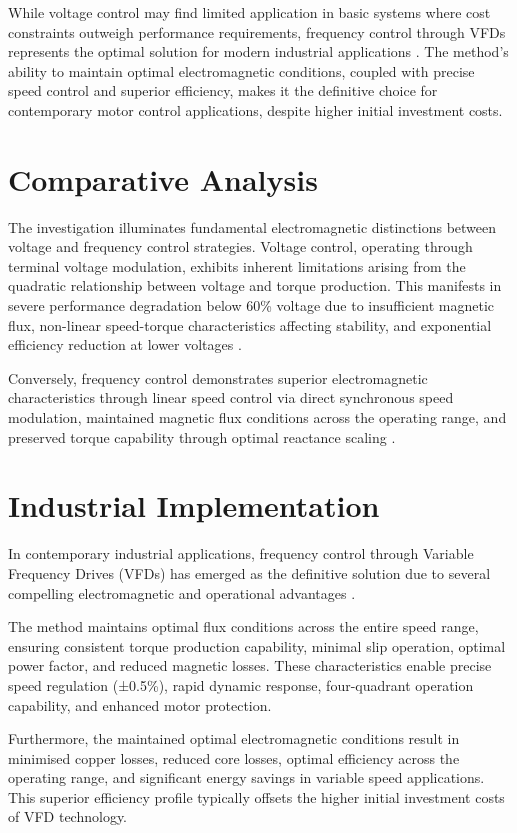 \documentclass[a4paper,12pt]{article}
\begin{document}
While voltage control may find limited application in basic systems where cost constraints outweigh performance requirements, frequency control through VFDs represents the optimal solution for modern industrial applications \cite{chapman2021}. The method's ability to maintain optimal electromagnetic conditions, coupled with precise speed control and superior efficiency, makes it the definitive choice for contemporary motor control applications, despite higher initial investment costs.

\section{Comparative Analysis}
The investigation illuminates fundamental electromagnetic distinctions between voltage and frequency control strategies. Voltage control, operating through terminal voltage modulation, exhibits inherent limitations arising from the quadratic relationship between voltage and torque production. This manifests in severe performance degradation below 60\% voltage due to insufficient magnetic flux, non-linear speed-torque characteristics affecting stability, and exponential efficiency reduction at lower voltages \cite{fitzgerald2020}.

Conversely, frequency control demonstrates superior electromagnetic characteristics through linear speed control via direct synchronous speed modulation, maintained magnetic flux conditions across the operating range, and preserved torque capability through optimal reactance scaling \cite{mohan2014}.

\section{Industrial Implementation}
In contemporary industrial applications, frequency control through Variable Frequency Drives (VFDs) has emerged as the definitive solution due to several compelling electromagnetic and operational advantages \cite{sen2021}.

The method maintains optimal flux conditions across the entire speed range, ensuring consistent torque production capability, minimal slip operation, optimal power factor, and reduced magnetic losses. These characteristics enable precise speed regulation (±0.5\%), rapid dynamic response, four-quadrant operation capability, and enhanced motor protection.

Furthermore, the maintained optimal electromagnetic conditions result in minimised copper losses, reduced core losses, optimal efficiency across the operating range, and significant energy savings in variable speed applications. This superior efficiency profile typically offsets the higher initial investment costs of VFD technology.
\end{document}
